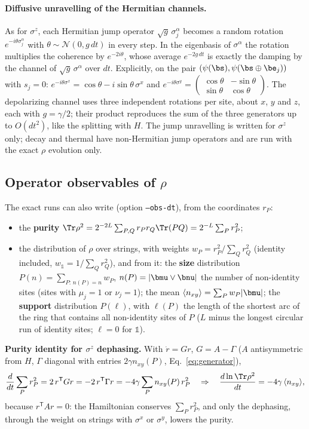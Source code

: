 \paragraph{Diffusive unravelling of the Hermitian channels.} As for $\sigma^z$, each Hermitian jump operator $\sqrt{g}\,\sigma^\alpha_j$ becomes a random rotation $e^{-i\theta\sigma^\alpha_j}$ with $\theta \sim \mathcal N(0, g\,dt)$ in every step. In the eigenbasis of $\sigma^\alpha$ the rotation multiplies the coherence by $e^{-2i\theta}$, whose average $e^{-2g\,dt}$ is exactly the damping by the channel of $\sqrt g\,\sigma^\alpha$ over $dt$. Explicitly, on the pair $(\psi(\bs), \psi(\bs\oplus\be_j))$ with $s_j = 0$: $e^{-i\theta\sigma^x} = \cos\theta - i\sin\theta\,\sigma^x$ and $e^{-i\theta\sigma^y} = \begin{pmatrix}\cos\theta & -\sin\theta\\ \sin\theta & \cos\theta\end{pmatrix}$. The depolarizing channel uses three independent rotations per site, about $x$, $y$ and $z$, each with $g = \gamma/2$; their product reproduces the sum of the three generators up to $O(dt^2)$, like the splitting with $H$. The jump unravelling is written for $\sigma^z$ only; decay and thermal have non-Hermitian jump operators and are run with the exact $\rho$ evolution only.

\subsection{Operator observables of $\rho$}
\label{sec:opobs}

The exact runs can also write (option \texttt{--obs-dt}), from the coordinates $r_P$:
\begin{itemize}
\item the \textbf{purity} $\Tr\rho^2 = 2^{-2L}\sum_{P,Q}r_Pr_Q\Tr(PQ) = 2^{-L}\sum_P r_P^2$;
\item the distribution of $\rho$ over strings, with weights $w_P = r_P^2/\sum_Q r_Q^2$ (identity included, $w_{\mathds 1} = 1/\sum_Q r_Q^2$), and from it: the \textbf{size} distribution $P(n) = \sum_{P:\,n(P) = n} w_P$, $n(P) = \lvert\bmu\vee\bnu\rvert$ the number of non-identity sites (sites with $\mu_j = 1$ or $\nu_j = 1$); the mean $\langle n_{xy}\rangle = \sum_P w_P\lvert\bmu\rvert$; the \textbf{support} distribution $P(\ell)$, with $\ell(P)$ the length of the shortest arc of the ring that contains all non-identity sites of $P$ ($L$ minus the longest circular run of identity sites; $\ell = 0$ for $\mathds 1$).
\end{itemize}
\textbf{Purity identity for $\sigma^z$ dephasing.} With $\dot r = Gr$, $G = A - \Gamma$ ($A$ antisymmetric from $H$, $\Gamma$ diagonal with entries $2\gamma n_{xy}(P)$, Eq.~\eqref{eq:generator}),
\begin{equation}
\frac{d}{dt}\sum_P r_P^2 = 2\,r^{\mathsf T}Gr = -2\,r^{\mathsf T}\Gamma r = -4\gamma\sum_P n_{xy}(P)\,r_P^2
\quad\Rightarrow\quad
\frac{d\ln\Tr\rho^2}{dt} = -4\gamma\,\langle n_{xy}\rangle ,
\end{equation}
because $r^{\mathsf T}Ar = 0$: the Hamiltonian conserves $\sum_P r_P^2$, and only the dephasing, through the weight on strings with $\sigma^x$ or $\sigma^y$, lowers the purity.

